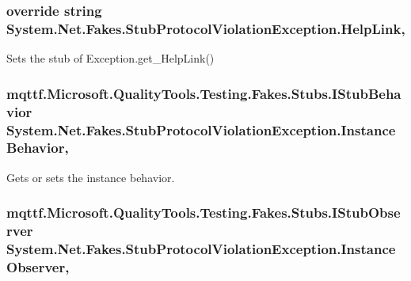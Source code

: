 \hypertarget{class_system_1_1_net_1_1_fakes_1_1_stub_protocol_violation_exception_a9812873c1e3730c37137a8524ae61da0}{
\subsubsection[{Help\-Link}]{\setlength{\rightskip}{0pt plus 5cm}override string System.\-Net.\-Fakes.\-Stub\-Protocol\-Violation\-Exception.\-Help\-Link\hspace{0.3cm}{\ttfamily [get]}, {\ttfamily [set]}}}\label{class_system_1_1_net_1_1_fakes_1_1_stub_protocol_violation_exception_a9812873c1e3730c37137a8524ae61da0}


Sets the stub of Exception.\-get\-\_\-\-Help\-Link()

\hypertarget{class_system_1_1_net_1_1_fakes_1_1_stub_protocol_violation_exception_abe9c2727dcafc72798d67e02cd1fb1a0}{
\subsubsection[{Instance\-Behavior}]{\setlength{\rightskip}{0pt plus 5cm}mqttf.\-Microsoft.\-Quality\-Tools.\-Testing.\-Fakes.\-Stubs.\-I\-Stub\-Behavior System.\-Net.\-Fakes.\-Stub\-Protocol\-Violation\-Exception.\-Instance\-Behavior\hspace{0.3cm}{\ttfamily [get]}, {\ttfamily [set]}}}\label{class_system_1_1_net_1_1_fakes_1_1_stub_protocol_violation_exception_abe9c2727dcafc72798d67e02cd1fb1a0}


Gets or sets the instance behavior.

\hypertarget{class_system_1_1_net_1_1_fakes_1_1_stub_protocol_violation_exception_a93aa29f60ce3fec0e3086107ce9ac2d6}{
\subsubsection[{Instance\-Observer}]{\setlength{\rightskip}{0pt plus 5cm}mqttf.\-Microsoft.\-Quality\-Tools.\-Testing.\-Fakes.\-Stubs.\-I\-Stub\-Observer System.\-Net.\-Fakes.\-Stub\-Protocol\-Violation\-Exception.\-Instance\-Observer\hspace{0.3cm}{\ttfamily [get]}, {\ttfamily [set]}}}\label{class_system_1_1_net_1_1_fakes_1_1_stub_protocol_violation_exception_a93aa29f60ce3fec0e3086107ce9ac2d6}


